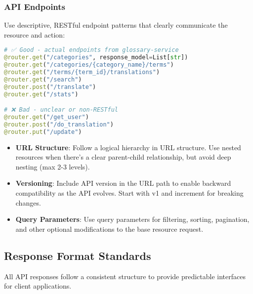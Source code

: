 \documentclass[12pt]{article}
\begin{document}
\subsubsection{API Endpoints}
Use descriptive, RESTful endpoint patterns that clearly communicate the resource and action:

\begin{lstlisting}[language=Python]
# ✅ Good - actual endpoints from glossary-service
@router.get("/categories", response_model=List[str])
@router.get("/categories/{category_name}/terms")
@router.get("/terms/{term_id}/translations")
@router.get("/search")
@router.post("/translate")
@router.get("/stats")

# ❌ Bad - unclear or non-RESTful
@router.get("/get_user")
@router.post("/do_translation")
@router.put("/update")
\end{lstlisting}

\begin{itemize}
    \item \textbf{URL Structure}: Follow a logical hierarchy in URL structure. Use nested resources when there's a clear parent-child relationship, but avoid deep nesting (max 2-3 levels).
    
    \item \textbf{Versioning}: Include API version in the URL path to enable backward compatibility as the API evolves. Start with v1 and increment for breaking changes.
    
    \item \textbf{Query Parameters}: Use query parameters for filtering, sorting, pagination, and other optional modifications to the base resource request.
\end{itemize}

\subsection{Response Format Standards}
All API responses follow a consistent structure to provide predictable interfaces for client applications.
\end{document}
